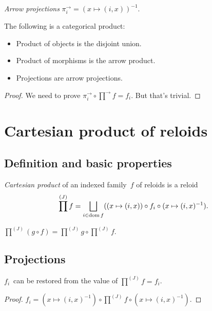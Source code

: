 \begin{defn}
\emph{Arrow projections}
$\pi^{\rightarrow}_i = (x\mapsto(i,x))^{-1}$.
\end{defn}

\begin{thm}
The following is a categorical product:
\begin{itemize}
\item Product of objects is the disjoint union.
\item Product of morphisms is the arrow product.
\item Projections are arrow projections.
\end{itemize}
\end{thm}

\begin{proof}
We need to prove $\pi^{\rightarrow}_i\circ\prod^{\rightarrow}f=f_i$. But that's trivial.
\end{proof}

\section{Cartesian product of reloids}

\subsection{Definition and basic properties}

\begin{defn}
\emph{Cartesian product} of an indexed family~$f$ of reloids is
a reloid \[ \prod^{(J)} f=\bigsqcup_{i\in\dom f}((x\mapsto(i,x))\circ f_i\circ(x\mapsto(i,x)^{-1}). \]
\end{defn}

\begin{conjecture}
$\prod^{(J)}(g\circ f)=\prod^{(J)}g\circ\prod^{(J)}f$.
\end{conjecture}

\subsection{Projections}

\begin{thm}
$f_i$~can be restored from the value of $\prod^{(J)}f=f_i$.
\end{thm}

\begin{proof}
$f_i = (x\mapsto(i,x)^{-1})\circ\prod^{(J)}f\circ(x\mapsto(i,x)^{-1})$.
\end{proof}

